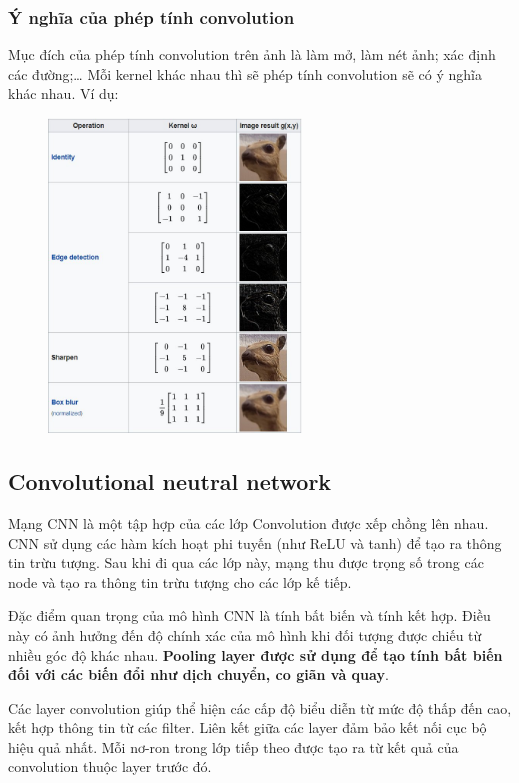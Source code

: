 \subsubsection{Ý nghĩa của phép tính convolution }
Mục đích của phép tính convolution trên ảnh là làm mở, làm nét ảnh; xác định các đường;… Mỗi kernel khác nhau thì sẽ phép tính convolution sẽ có ý nghĩa khác nhau. Ví dụ:
\newpage
\begin{figure}[htbp]
        \centering
        \includegraphics[width=0.6\textwidth]{images/1/image.png}
        \caption{}
\end{figure}
%
%
%
%
%
%
%
%
%
\subsection{Convolutional neutral network}
Mạng CNN là một tập hợp của các lớp Convolution được xếp chồng lên nhau. CNN sử dụng các hàm kích hoạt phi tuyến (như ReLU và tanh) để tạo ra thông tin trừu tượng. Sau khi đi qua các lớp này, mạng thu được trọng số trong các node và tạo ra thông tin trừu tượng cho các lớp kế tiếp.

\noindent Đặc điểm quan trọng của mô hình CNN là tính bất biến và tính kết hợp. Điều này có ảnh hưởng đến độ chính xác của mô hình khi đối tượng được chiếu từ nhiều góc độ khác nhau. \textbf{Pooling layer được sử dụng để tạo tính bất biến đối với các biến đổi như dịch chuyển, co giãn và quay}.

\noindent Các layer convolution giúp thể hiện các cấp độ biểu diễn từ mức độ thấp đến cao, kết hợp thông tin từ các filter. Liên kết giữa các layer đảm bảo kết nối cục bộ hiệu quả nhất. Mỗi nơ-ron trong lớp tiếp theo được tạo ra từ kết quả của convolution thuộc layer trước đó.

